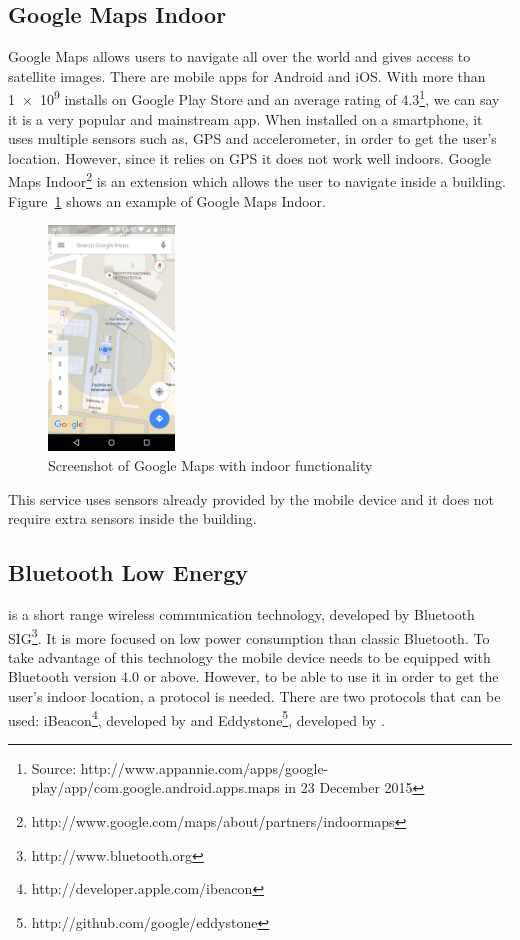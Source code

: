 \subsection{Google Maps Indoor}
\label{sub:background_google_maps_indoor}
Google Maps allows users to navigate all over the world and gives access to satellite images.
There are mobile apps for Android and iOS.
With more than \num{1e9} installs on Google Play Store and an average rating of 4.3\footnote{Source: http://www.appannie.com/apps/google-play/app/com.google.android.apps.maps in 23 December 2015}, we can say it is a very popular and mainstream app.
When installed on a smartphone, it uses multiple sensors such as, \gls{GPS} and accelerometer, in order to get the user's location.
However, since it relies on \gls{GPS} it does not work well indoors.
Google Maps Indoor\footnote{http://www.google.com/maps/about/partners/indoormaps} is an extension which allows the user to navigate inside a building.
Figure~\ref{fig:google_maps_indoor} shows an example of Google Maps Indoor.

\begin{figure}[!ht]
  \centering
    \includegraphics[width=0.3\textwidth, keepaspectratio]{images/screenshots/google_maps_indoor}
    \caption[Google Maps Indoor]{Screenshot of Google Maps with indoor functionality}
    \label{fig:google_maps_indoor}
\end{figure}

This service uses sensors already provided by the mobile device and it does not require extra sensors inside the building.

\subsection{Bluetooth Low Energy}
\label{sub:background_bluetooth_low_energy}
\cite{ble} is a short range wireless communication technology, developed by Bluetooth \gls{SIG}\footnote{http://www.bluetooth.org}.
It is more focused on low power consumption than classic Bluetooth.
To take advantage of this technology the mobile device needs to be equipped with Bluetooth version 4.0\cite{bluetooth_specification} or above.
However, to be able to use it in order to get the user's indoor location, a protocol is needed.
There are two protocols that can be used: iBeacon\footnote{http://developer.apple.com/ibeacon}, developed by  and Eddystone\footnote{http://github.com/google/eddystone}, developed by .


